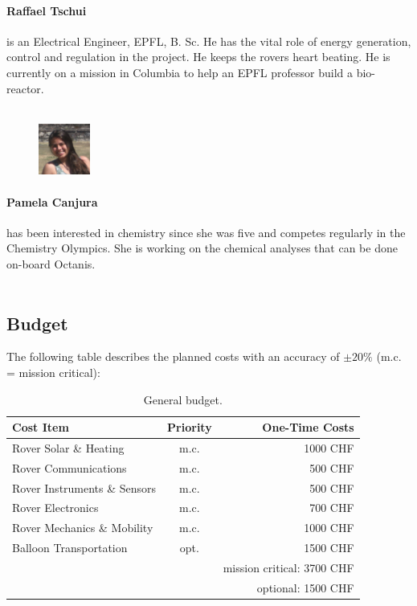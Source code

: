 \documentclass[a4paper,12pt]{article}
\begin{document}
\paragraph{Raffael Tschui} is an Electrical Engineer, EPFL, B. Sc. He has the vital role of energy generation, control and regulation in the project. He keeps the rovers heart beating. He is currently on a mission in Columbia to help an EPFL professor build a bio-reactor.
\\ \\

\begin{figure}
    \centering
    \vspace{-13pt}
    \includegraphics[width=0.15\textwidth]{pam}
\end{figure} 
\paragraph{Pamela Canjura} has been interested in chemistry since she was five and competes regularly in the Chemistry Olympics. She is working on the chemical analyses that can be done on-board Octanis.
\\ \\


\subsection{Budget}

The following table describes the planned costs with an accuracy of $\pm 20\%$ (m.c. = mission critical): \\ 

\begin{table}[h!]
\centering
\begin{tabular}{ l | c || r }
  Cost Item & Priority & One-Time Costs \\
  \hline
  Rover Solar \& Heating & m.c. & 1000 CHF \\
  Rover Communications & m.c. & 500 CHF \\
  Rover Instruments \& Sensors & m.c. & 500 CHF \\
  Rover Electronics & m.c. & 700 CHF \\
  Rover Mechanics \& Mobility & m.c. & 1000 CHF \\
  Balloon Transportation & opt. & 1500 CHF \\
  \hline \hline
  & & mission critical: 3700 CHF  \\
  & & optional: 1500 CHF \\
\end{tabular}
\caption{General budget.}
\end{table}
\end{document}
